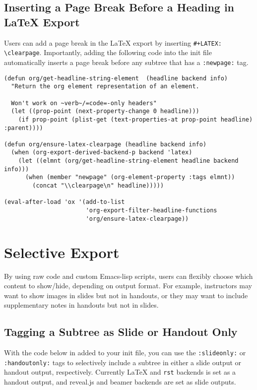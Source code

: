 \documentclass[10pt,article]{article}
\begin{document}
\subsection{Inserting a Page Break Before a Heading in \LaTeX{} Export}
\label{sec:org4031826}
Users can add a page break in the \LaTeX{} export by inserting
\texttt{\#+LATEX: \textbackslash{}clearpage}. Importantly, adding the following code into the init file
automatically inserts a page break before any subtree that has a \texttt{:newpage:}
tag.

{\small
\begin{verbatim}
(defun org/get-headline-string-element  (headline backend info)
  "Return the org element representation of an element.

  Won't work on ~verb~/=code=-only headers"
  (let ((prop-point (next-property-change 0 headline)))
    (if prop-point (plist-get (text-properties-at prop-point headline) :parent))))

(defun org/ensure-latex-clearpage (headline backend info)
  (when (org-export-derived-backend-p backend 'latex)
    (let ((elmnt (org/get-headline-string-element headline backend info)))
      (when (member "newpage" (org-element-property :tags elmnt))
        (concat "\\clearpage\n" headline)))))

(eval-after-load 'ox '(add-to-list
                       'org-export-filter-headline-functions
                       'org/ensure-latex-clearpage))
\end{verbatim}
}
\section{Selective Export}
\label{sec:orgf513811}
By using raw code and custom Emacs-lisp scripts, users can flexibly choose
which content to show/hide, depending on output format. For example,
instructors may want to show images in slides but not in handouts, or they may
want to include supplementary notes in handouts but not in slides.
\subsection{Tagging a Subtree as Slide or Handout Only}
\label{sec:orgee0648a}
With the code below in added to your init file, you can use the \texttt{:slideonly:}
or \texttt{:handoutonly:} tags to selectively include a subtree in either a slide
output or handout output, respectively. Currently \LaTeX{} and \texttt{rst} backends is
set as a handout output, and reveal.js and beamer backends are set as slide
outputs.
\end{document}
